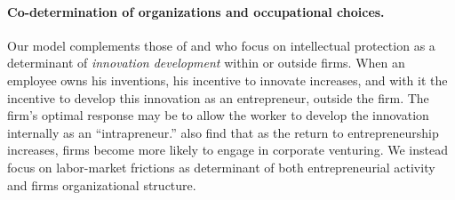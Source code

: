 \documentclass[12pt,american]{paper}
\theoremstyle{remark}
\begin{document}
\paragraph{Co-determination of organizations and occupational choices.} 



Our model complements those of \cite{Hellmann:2007tk} and \cite{de2008corporate} who focus on intellectual protection as a determinant of \textit{innovation development} within or outside firms. When an employee owns his  inventions, his incentive to innovate increases, and with it the incentive to develop this innovation as an entrepreneur, outside the firm.  The firm's optimal response may be to allow the worker to develop the innovation internally as an ``intrapreneur.'' \citet{de2008corporate} also find that as the return to entrepreneurship increases, firms become more likely to engage in corporate venturing. We instead focus on labor-market frictions as determinant of both entrepreneurial activity and firms organizational structure.
\end{document}
